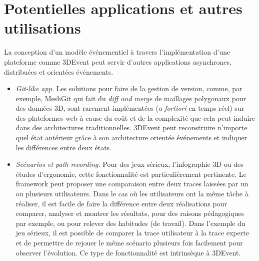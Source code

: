 \section{Potentielles applications et autres utilisations}
La conception d'un modèle événementiel à travers l'implémentation d'une plateforme 
comme 3DEvent peut servir d'autres applications 
asynchrones, distribuées et orientées événements.
\begin{itemize}
	\item \textit{Git-like app.} Les solutions pour faire de la gestion de version, comme, 
	par exemple,
 	Mesh\-Git \cite{Denning2013} qui fait du
	\textit{diff and merge} de maillages polygonaux pour des données \gls{3D}, 
	sont rarement implémentées (\textit{a fortiori} en 
	temps réel) sur des plateformes web à cause du coût et de la complexité que 
	cela peut induire dans des architectures traditionnelles. 3DEvent peut 
	reconstruire n'importe quel état antérieur grâce à son architecture orientée 
	événements et indiquer les différences entre deux états.
	
	\item \textit{Scénarios et \textit{path recording}.} Pour des jeux sérieux, l'infographie 
	3D ou des études d'ergonomie, cette fonctionnalité est particulièrement 
	pertinente. Le \gls{framework} peut proposer une comparaison entre deux traces 
	laissées par un ou plusieurs utilisateurs. Dans le cas où les utilisateurs ont la 
	même tâche à réaliser, il est facile de faire la différence entre deux réalisations 
	pour comparer, analyser et montrer les résultats, pour des raisons 
	pédagogiques par exemple, ou pour relever des habitudes (de travail). Dans 
	l'exemple du jeu sérieux, il est possible de comparer la trace utilisateur à la trace experte 
	et de permettre de rejouer le même scénario plusieurs fois facilement pour 
	observer l'évolution. Ce type de fonctionnalité est intrinsèque à 3DEvent. 
	

\end{itemize}
